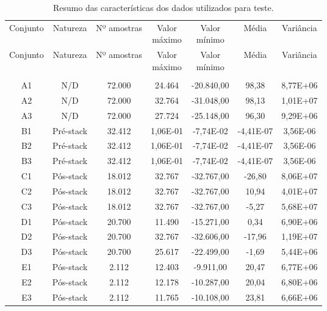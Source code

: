 \begin{center}
\begin{longtable}{ccccccc}
\toprule
\rowcolor{white}
\caption[Resumo das características dos dados de teste]{Resumo das
características dos dados utilizados para teste.}
\label{Tab:resumocaracteristicas}
\\
\midrule
\rowcolor{white}
Conjunto & Natureza & Nº amostras & \specialcell{Valor\\máximo} &
\specialcell{Valor\\mínimo} & Média & Variância \\
\midrule
\endfirsthead
\midrule
\rowcolor{white}
Conjunto & Natureza & Nº amostras & \specialcell{Valor\\máximo} &
\specialcell{Valor\\mínimo} & Média & Variância \\
\toprule
\endhead
\midrule \\ %
\endfoot
\bottomrule
\endlastfoot
A1&N/D&72.000&24.464&-20.840,00&98,38&8,77E+06\\
A2&N/D&72.000&32.764&-31.048,00&98,13&1,01E+07\\
A3&N/D&72.000&27.724&-25.148,00&96,30&9,29E+06\\
B1&Pré-stack&32.412&1,06E-01&-7,74E-02&-4,41E-07&3,56E-06\\
B2&Pré-stack&32.412&1,06E-01&-7,74E-02&-4,41E-07&3,56E-06\\
B3&Pré-stack&32.412&1,06E-01&-7,74E-02&-4,41E-07&3,56E-06\\
C1&Pós-stack&18.012&32.767&-32.767,00&-26,80&8,06E+07\\
C2&Pós-stack&18.012&32.767&-32.767,00&10,94&4,01E+07\\
C3&Pós-stack&18.012&32.767&-32.767,00&-5,27&5,68E+07\\
D1&Pós-stack&20.700&11.490&-15.271,00&0,34&6,90E+06\\
D2&Pós-stack&20.700&32.767&-32.606,00&-17,96&1,19E+07\\
D3&Pós-stack&20.700&25.617&-22.499,00&-1,69&5,44E+06\\
E1&Pós-stack&2.112&12.403&-9.911,00&20,47&6,77E+06\\
E2&Pós-stack&2.112&12.178&-10.287,00&20,04&6,80E+06\\
E3&Pós-stack&2.112&11.765&-10.108,00&23,81&6,66E+06\\

\end{longtable}
\end{center}
